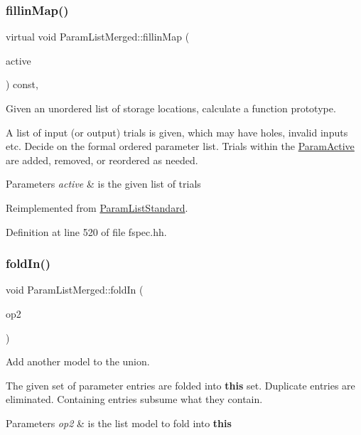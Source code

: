 \subsubsection{\texorpdfstring{fillinMap()}{fillinMap()}}
{\footnotesize\ttfamily virtual void Param\+List\+Merged\+::fillin\+Map (\begin{DoxyParamCaption}\item[{\mbox{\hyperlink{class_param_active}{Param\+Active}} $\ast$}]{active }\end{DoxyParamCaption}) const\hspace{0.3cm}{\ttfamily [inline]}, {\ttfamily [virtual]}}



Given an unordered list of storage locations, calculate a function prototype. 

A list of input (or output) trials is given, which may have holes, invalid inputs etc. Decide on the formal ordered parameter list. Trials within the \mbox{\hyperlink{class_param_active}{Param\+Active}} are added, removed, or reordered as needed. 
\begin{DoxyParams}{Parameters}
{\em active} & is the given list of trials \\
\hline
\end{DoxyParams}


Reimplemented from \mbox{\hyperlink{class_param_list_standard_a7fa7043f5c6bba995e2ea716ca16ccaf}{Param\+List\+Standard}}.



Definition at line 520 of file fspec.\+hh.

\mbox{\label{class_param_list_merged_a2e1b347dc631d5efdc049ec29d73b30f}} 
\subsubsection{\texorpdfstring{foldIn()}{foldIn()}}
{\footnotesize\ttfamily void Param\+List\+Merged\+::fold\+In (\begin{DoxyParamCaption}\item[{const \mbox{\hyperlink{class_param_list_standard}{Param\+List\+Standard}} \&}]{op2 }\end{DoxyParamCaption})}



Add another model to the union. 

The given set of parameter entries are folded into {\bfseries{this}} set. Duplicate entries are eliminated. Containing entries subsume what they contain. 
\begin{DoxyParams}{Parameters}
{\em op2} & is the list model to fold into {\bfseries{this}} \\
\hline
\end{DoxyParams}


